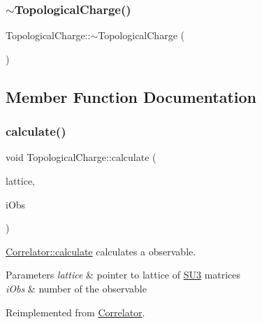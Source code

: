 \subsubsection{\texorpdfstring{$\sim$TopologicalCharge()}{~TopologicalCharge()}}
{\footnotesize\ttfamily Topological\+Charge\+::$\sim$\+Topological\+Charge (\begin{DoxyParamCaption}{ }\end{DoxyParamCaption})}



\subsection{Member Function Documentation}
\mbox{\label{class_topological_charge_a8ed78c28c3484df04b1cb24187de2f5b}} 
\subsubsection{\texorpdfstring{calculate()}{calculate()}}
{\footnotesize\ttfamily void Topological\+Charge\+::calculate (\begin{DoxyParamCaption}\item[{\mbox{\hyperlink{class_lattice}{Lattice}}$<$ \mbox{\hyperlink{class_s_u3}{S\+U3}} $>$ $\ast$}]{lattice,  }\item[{unsigned int}]{i\+Obs }\end{DoxyParamCaption})\hspace{0.3cm}{\ttfamily [virtual]}}



\mbox{\hyperlink{class_correlator_ab33502ff305f891c5c2e6d66a26a0247}{Correlator\+::calculate}} calculates a observable. 


\begin{DoxyParams}{Parameters}
{\em lattice} & pointer to lattice of \mbox{\hyperlink{class_s_u3}{S\+U3}} matrices \\
\hline
{\em i\+Obs} & number of the observable \\
\hline
\end{DoxyParams}


Reimplemented from \mbox{\hyperlink{class_correlator_ab33502ff305f891c5c2e6d66a26a0247}{Correlator}}.

